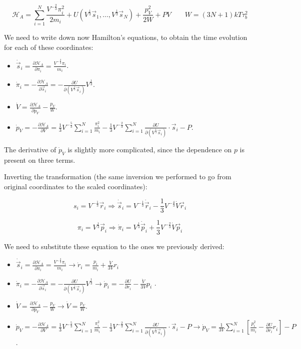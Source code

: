 $$\mathcal{H}_A = \sum\limits_{i=1}^N\frac{V^{-\frac{2}{3}}\pi_i^2}{2m_i}+ U(V^\frac{1}{3}\vec{s}_1, \dots, V^{\frac{1}{3}}\vec{s}_N) + \frac{p_V^2}{2W} + PV\qquad W = (3N+1)kT\tau_b^2$$


We need to write down now Hamilton's equations, to obtain the time evolution for each of these coordinates:

\begin{itemize}
	\item $\dot{\vec{s}}_i = \frac{\partial \mathcal{H}_A}{\partial\pi_i} = \frac{V^{-\frac{2}{3}}\pi_i}{m_i}$.
	\item $\dot{\pi}_i = -\frac{\partial\mathcal{H}_A}{\partial\vec{s}_i} = -\frac{\partial U}{\partial (V^{\frac{1}{3}}\vec{s}_i)}V^{\frac{1}{3}}$.
	\item $\dot{V} = \frac{\partial\mathcal{H}_A}{\partial p_V}-\frac{p_V}{W}$.
	\item $\dot{p}_V = -\frac{\partial\mathcal{H}_A}{\partial V} = \frac{1}{3}V^{-\frac{5}{3}}\sum\limits_{i=1}^N\frac{\pi_i^2}{m_i}-\frac{1}{3}V^{-\frac{2}{3}}\sum\limits_{i=1}^N\frac{\partial U}{\partial(V^{\frac{1}{3}}\vec{s}_i)}\cdot\vec{s}_i-P$.
\end{itemize}

The derivative of $\dot{p}_V$ is slightly more complicated, since the dependence on $p$ is present on three terms. 

Inverting the transformation (the same inversion we performed to go from original coordinates to the scaled coordinates):

$$s_i = V^{-\frac{1}{3}}\vec{r}_i\Rightarrow \dot{\vec{s}}_i = V^{-\frac{1}{3}}\dot{\vec{r}}_i-\frac{1}{3}V^{-\frac{4}{3}}\dot{V}\vec{r}_i$$


$$\pi_i = V^{\frac{1}{3}}\vec{p}_i \Rightarrow \dot{\pi}_i = V^{\frac{1}{3}}\dot{\vec{p}}_i + \frac{1}{3}V^{-\frac{2}{3}}\dot{V}\vec{p}_i$$


We need to substitute these equation to the ones we previously derived:

\begin{itemize}
	\item $\dot{\vec{s}}_i = \frac{\partial \mathcal{H}_A}{\partial\pi_i} = \frac{V^{-\frac{2}{3}}\pi_i}{m_i} \rightarrow \dot{r}_i = \frac{p_i}{m_i} + \frac{\dot{V}}{3V} r_i$
	\item $\dot{\pi}_i = -\frac{\partial\mathcal{H}_A}{\partial\vec{s}_i} = -\frac{\partial U}{\partial (V^{\frac{1}{3}}\vec{s}_i)}V^{\frac{1}{3}} \rightarrow \dot{p}_i = - \frac{\partial U}{\partial r_i} - \frac{\dot{V} }{3V} p_i$ .
	\item $\dot{V} = \frac{\partial\mathcal{H}_A}{\partial p_V}-\frac{p_V}{W} \rightarrow \dot{V} = \frac{p_V}{W}$.
	\item $\dot{p}_V = -\frac{\partial\mathcal{H}_A}{\partial V} = \frac{1}{3}V^{-\frac{5}{3}}\sum\limits_{i=1}^N\frac{\pi_i^2}{m_i}-\frac{1}{3}V^{-\frac{2}{3}}\sum\limits_{i=1}^N\frac{\partial U}{\partial(V^{\frac{1}{3}}\vec{s}_i)}\cdot\vec{s}_i-P \rightarrow \dot{p}_V = \frac{1}{3V} \sum^N_{i=1} [\frac{p^2_i}{m_i} - \frac{\partial U}{\partial r_i} r_i] -P$.
\end{itemize}

